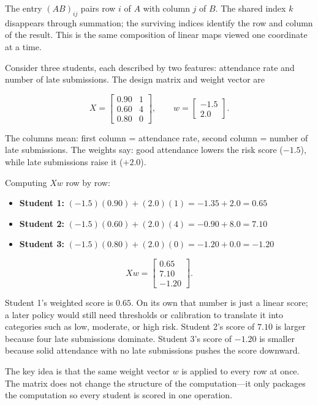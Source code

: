 The entry $(AB)_{ij}$ pairs row $i$ of $A$ with column $j$ of $B$. The shared index $k$ disappears through summation; the surviving indices identify the row and column of the result. This is the same composition of linear maps viewed one coordinate at a time.

\begin{example}
Consider three students, each described by two features: attendance rate and number of late submissions. The design matrix and weight vector are

\[
X =
\begin{bmatrix}
0.90 & 1 \\
0.60 & 4 \\
0.80 & 0
\end{bmatrix},
\qquad
w =
\begin{bmatrix}
-1.5 \\
2.0
\end{bmatrix}.
\]

The columns mean: first column = attendance rate, second column = number of late submissions. The weights say: good attendance lowers the risk score (\(-1.5\)), while late submissions raise it (\(+2.0\)).

Computing \(Xw\) row by row:

\begin{itemize}[leftmargin=*]
\item \textbf{Student 1:} \((-1.5)(0.90) + (2.0)(1) = -1.35 + 2.0 = 0.65\)
\item \textbf{Student 2:} \((-1.5)(0.60) + (2.0)(4) = -0.90 + 8.0 = 7.10\)
\item \textbf{Student 3:} \((-1.5)(0.80) + (2.0)(0) = -1.20 + 0.0 = -1.20\)
\end{itemize}

\[
Xw =
\begin{bmatrix}
0.65 \\
7.10 \\
-1.20
\end{bmatrix}.
\]

Student 1's weighted score is \(0.65\). On its own that number is just a linear score; a later policy would still need thresholds or calibration to translate it into categories such as low, moderate, or high risk. Student 2's score of \(7.10\) is larger because four late submissions dominate. Student 3's score of \(-1.20\) is smaller because solid attendance with no late submissions pushes the score downward.

The key idea is that the same weight vector \(w\) is applied to every row at once. The matrix does not change the structure of the computation---it only packages the computation so every student is scored in one operation.
\end{example}

